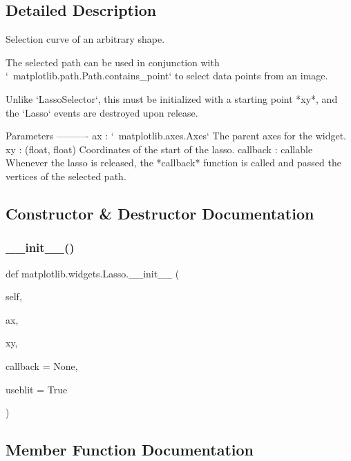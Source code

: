 \subsection{Detailed Description}
\begin{DoxyVerb}Selection curve of an arbitrary shape.

The selected path can be used in conjunction with
`~matplotlib.path.Path.contains_point` to select data points from an image.

Unlike `LassoSelector`, this must be initialized with a starting
point *xy*, and the `Lasso` events are destroyed upon release.

Parameters
----------
ax : `~matplotlib.axes.Axes`
    The parent axes for the widget.
xy : (float, float)
    Coordinates of the start of the lasso.
callback : callable
    Whenever the lasso is released, the *callback* function is called and
    passed the vertices of the selected path.
\end{DoxyVerb}
 

\subsection{Constructor \& Destructor Documentation}
\mbox{\label{classmatplotlib_1_1widgets_1_1Lasso_a1372ded6248404a0bd8b557d721c709e}} 
\subsubsection{\texorpdfstring{\+\_\+\+\_\+init\+\_\+\+\_\+()}{\_\_init\_\_()}}
{\footnotesize\ttfamily def matplotlib.\+widgets.\+Lasso.\+\_\+\+\_\+init\+\_\+\+\_\+ (\begin{DoxyParamCaption}\item[{}]{self,  }\item[{}]{ax,  }\item[{}]{xy,  }\item[{}]{callback = {\ttfamily None},  }\item[{}]{useblit = {\ttfamily True} }\end{DoxyParamCaption})}



\subsection{Member Function Documentation}
\mbox{\label{classmatplotlib_1_1widgets_1_1Lasso_a9246d06eb71f545df91a7447d1784113}} 
